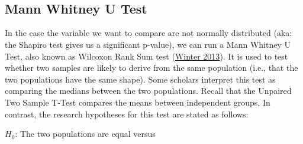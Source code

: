 \documentclass[
]{article}
\newenvironment{Shaded}{\begin{snugshade}}{\end{snugshade}}
\newcommand{\AttributeTok}[1]{\textcolor[rgb]{0.13,0.29,0.53}{#1}}
\newcommand{\CommentTok}[1]{\textcolor[rgb]{0.56,0.35,0.01}{\textit{#1}}}
\newcommand{\DecValTok}[1]{\textcolor[rgb]{0.00,0.00,0.81}{#1}}
\newcommand{\FunctionTok}[1]{\textcolor[rgb]{0.13,0.29,0.53}{\textbf{#1}}}
\newcommand{\NormalTok}[1]{#1}
\newcommand{\OtherTok}[1]{\textcolor[rgb]{0.56,0.35,0.01}{#1}}
\newcommand{\SpecialCharTok}[1]{\textcolor[rgb]{0.81,0.36,0.00}{\textbf{#1}}}
\newcommand{\StringTok}[1]{\textcolor[rgb]{0.31,0.60,0.02}{#1}}
\begin{document}
\begin{Shaded}
\end{Shaded}

~

~

\hypertarget{mann-whitney-u-test}{%
\subsection{Mann Whitney U Test}\label{mann-whitney-u-test}}

In the case the variable we want to compare are not normally distributed
(aka: the Shapiro test gives us a significant p-value), we can run a
Mann Whitney U Test, also known as Wilcoxon Rank Sum test (\protect\hyperlink{ref-dewinter}{Winter 2013}).
It is used to test whether two samples are likely to derive from the
same population (i.e., that the two populations have the same shape).
Some scholars interpret this test as comparing the medians between the
two populations. Recall that the Unpaired Two Sample T-Test compares the
means between independent groups. In contrast, the research hypotheses
for this test are stated as follows:

\(H_0\): The two populations are equal versus
\end{document}
